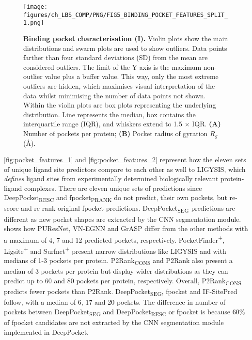 \begin{figure}[ht!]
    \centering
    \texttt{[image: figures/ch\_LBS\_COMP/PNG/FIG5\_BINDING\_POCKET\_FEATURES\_SPLIT\_1.png]}
    \caption[Binding pocket characterisation (I)]{\textbf{Binding pocket characterisation (I).} Violin plots show the main distributions and swarm plots are used to show outliers. Data points farther than four standard deviations (SD) from the mean are considered outliers. The limit of the Y axis is the maximum non-outlier value plus a buffer value. This way, only the most extreme outliers are hidden, which maximises visual interpretation of the data whilst minimising the number of data points not shown. Within the violin plots are box plots representing the underlying distribution. Line represents the median, box contains the interquartile range (IQR), and whiskers extend to 1.5 $\times$ IQR. \textbf{(A)} Number of pockets per protein; \textbf{(B)} Pocket radius of gyration $R_{g}$ (\AA{}).}
    \label{fig:pocket_features_1}
\end{figure}

\autoref{fig:pocket_features_1} and \autoref{fig:pocket_features_2} represent how the eleven sets of unique ligand site predictors compare to each other as well to LIGYSIS, which \textit{defines} ligand sites from experimentally determined biologically relevant protein-ligand complexes. There are eleven unique sets of predictions since DeepPocket\textsubscript{RESC} and fpocket\textsubscript{PRANK} do not predict, their own pockets, but re-score and re-rank original fpocket predictions. DeepPocket\textsubscript{SEG} predictions are different as new pocket shapes are extracted by the CNN segmentation module.  shows how PUResNet, VN-EGNN and GrASP differ from the other methods with a maximum of 4, 7 and 12 predicted pockets, respectively. PocketFinder\textsuperscript{+}, Ligsite\textsuperscript{+} and Surfnet\textsuperscript{+} present narrow distributions like LIGYSIS and with medians of 1-3 pockets per protein. P2Rank\textsubscript{CONS} and P2Rank also present a median of 3 pockets per protein but display wider distributions as they can predict up to 60 and 80 pockets per protein, respectively. Overall, P2Rank\textsubscript{CONS} predicts fewer pockets than P2Rank. DeepPocket\textsubscript{SEG}, fpocket and IF-SitePred follow, with a median of 6, 17 and 20 pockets. The difference in number of pockets between DeepPocket\textsubscript{SEG} and DeepPocket\textsubscript{RESC} or fpocket is because 60\% of fpocket candidates are not extracted by the CNN segmentation module implemented in DeepPocket.

